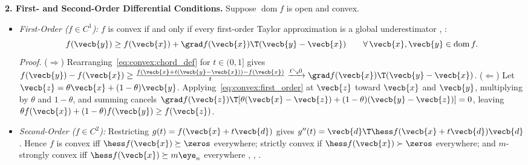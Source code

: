 \documentclass[../../../../master.tex]{subfiles}
\begin{document}
\begin{coremath}
\textbf{2. First- and Second-Order Differential Conditions.} Suppose $\operatorname{dom} f$ is open and convex.
\begin{itemize}[leftmargin=1.4em]
  \item \emph{First-Order ($f \in C^1$):} $f$ is convex if and only if every first-order Taylor approximation is a global underestimator , :
  \begin{equation}
    f(\vecb{y}) \ge f(\vecb{x}) + \grad f(\vecb{x})\T(\vecb{y} - \vecb{x}) \qquad \forall\,\vecb{x}, \vecb{y} \in \operatorname{dom} f.
    \label{eq:convex:first_order}
  \end{equation}
  \emph{Proof.} ($\Rightarrow$) Rearranging~\eqref{eq:convex:chord_def} for $t \in (0, 1]$ gives $f(\vecb{y}) - f(\vecb{x}) \ge \frac{f(\vecb{x} + t(\vecb{y}-\vecb{x})) - f(\vecb{x})}{t} \xrightarrow{t \searrow 0} \grad f(\vecb{x})\T(\vecb{y}-\vecb{x})$. ($\Leftarrow$) Let $\vecb{z} = \theta\vecb{x} + (1-\theta)\vecb{y}$. Applying~\eqref{eq:convex:first_order} at $\vecb{z}$ toward $\vecb{x}$ and $\vecb{y}$, multiplying by $\theta$ and $1-\theta$, and summing cancels $\grad f(\vecb{z})\T[\theta(\vecb{x}-\vecb{z}) + (1-\theta)(\vecb{y}-\vecb{z})] = 0$, leaving $\theta f(\vecb{x}) + (1-\theta)f(\vecb{y}) \ge f(\vecb{z})$.
  \item \emph{Second-Order ($f \in C^2$):} Restricting $g(t) = f(\vecb{x} + t\vecb{d})$ gives $g''(t) = \vecb{d}\T\hess f(\vecb{x} + t\vecb{d})\vecb{d}$. Hence $f$ is convex iff $\hess f(\vecb{x}) \succeq \zeros$ everywhere; strictly convex if $\hess f(\vecb{x}) \succ \zeros$ everywhere; and $m$-strongly convex iff $\hess f(\vecb{x}) \succeq m\eye_n$ everywhere , , .
\end{itemize}


\end{coremath}
\end{document}
